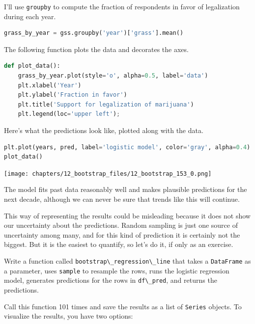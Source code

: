 I'll use \passthrough{\lstinline!groupby!} to compute the fraction of
respondents in favor of legalization during each year.

\begin{lstlisting}[language=Python,style=source]
grass_by_year = gss.groupby('year')['grass'].mean()
\end{lstlisting}

The following function plots the data and decorates the axes.

\begin{lstlisting}[language=Python,style=source]
def plot_data():
    grass_by_year.plot(style='o', alpha=0.5, label='data')
    plt.xlabel('Year')
    plt.ylabel('Fraction in favor')
    plt.title('Support for legalization of marijuana')
    plt.legend(loc='upper left');
\end{lstlisting}

Here's what the predictions look like, plotted along with the data.

\begin{lstlisting}[language=Python,style=source]
plt.plot(years, pred, label='logistic model', color='gray', alpha=0.4)
plot_data()
\end{lstlisting}

\begin{center}
\texttt{[image: chapters/12\_bootstrap\_files/12\_bootstrap\_153\_0.png]}
\end{center}

The model fits past data reasonably well and makes plausible predictions
for the next decade, although we can never be sure that trends like this
will continue.

This way of representing the results could be misleading because it does
not show our uncertainty about the predictions. Random sampling is just
one source of uncertainty among many, and for this kind of prediction it
is certainly not the biggest. But it is the easiest to quantify, so
let's do it, if only as an exercise.

Write a function called
\passthrough{\lstinline!bootstrap\_regression\_line!} that takes a
\passthrough{\lstinline!DataFrame!} as a parameter, uses
\passthrough{\lstinline!sample!} to resample the rows, runs the logistic
regression model, generates predictions for the rows in
\passthrough{\lstinline!df\_pred!}, and returns the predictions.

Call this function 101 times and save the results as a list of
\passthrough{\lstinline!Series!} objects. To visualize the results, you
have two options:

